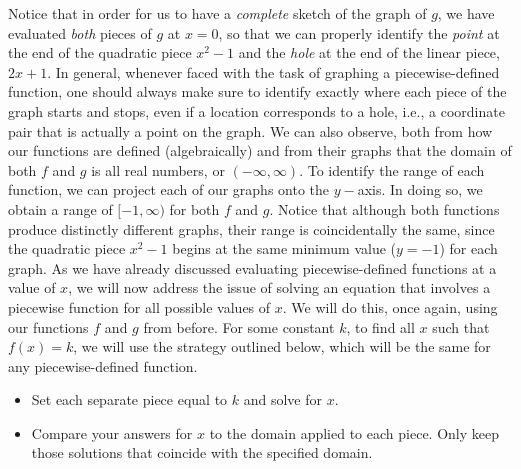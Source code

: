 Notice that in order for us to have a \textit{complete} sketch of the graph of $g$, we have evaluated \textit{both} pieces of $g$ at $x=0$, so that we can properly identify the \textit{point} at the end of the quadratic piece $x^2-1$ and the \textit{hole} at the end of the linear piece, $2x+1$. In general, whenever faced with the task of graphing a piecewise-defined function, one should always make sure to identify exactly where each piece of the graph starts and stops, even if a location corresponds to a hole, i.e., a coordinate pair that is  actually a point on the graph.\pp
We can also observe, both from how our functions are defined (algebraically) and from their graphs that the domain of both $f$ and $g$ is all real numbers, or $(-\infty,\infty)$.  To identify the range of each function, we can project each of our graphs onto the $y-$axis.  In doing so, we obtain a range of $[-1,\infty)$ for both $f$ and $g$.  Notice that although both functions produce distinctly different graphs, their range is coincidentally the same, since the quadratic piece $x^2-1$ begins at the same minimum value ($y=-1$) for each graph.\pp
As we have already discussed evaluating piecewise-defined functions at a value of $x$, we will now address the issue of solving an equation that involves a piecewise function for all possible values of $x$.  We will do this, once again, using our functions $f$ and $g$ from before.\pp
For some constant $k$, to find all $x$ such that $f(x)=k$, we will use the strategy outlined below, which will be the same for any piecewise-defined function.
	\begin{itemize}
		\item Set each separate piece equal to $k$ and solve for $x$.
		\item Compare your answers for $x$ to the domain applied to each piece.  Only keep those solutions that coincide with the specified domain.
	\end{itemize}
